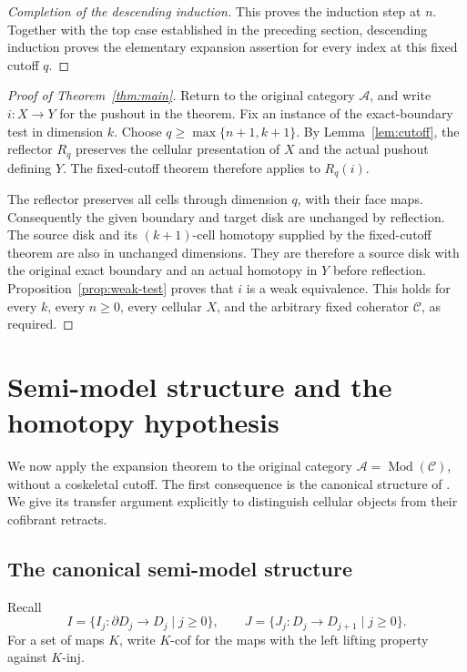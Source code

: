 \documentclass[11pt,letterpaper]{article}
\numberwithin{equation}{section}
\theoremstyle{plain}
\theoremstyle{definition}
\theoremstyle{remark}
\DeclareMathOperator{\Mod}{Mod}
\begin{document}
\begin{proof}[Completion of the descending induction]
This proves the induction step at \(n\).  Together with the top
case established in the preceding section, descending induction proves
the elementary expansion assertion for every index at this fixed
cutoff \(q\).
\end{proof}

\begin{proof}[Proof of Theorem~\ref{thm:main}]
Return to the original category \(\mathcal A\), and write
\(i:X\to Y\) for the pushout in the theorem.  Fix an instance of
the exact-boundary test in dimension \(k\).  Choose
\(q\ge\max\{n+1,k+1\}\).  By Lemma~\ref{lem:cutoff}, the
reflector \(R_q\) preserves the cellular presentation of \(X\)
and the actual pushout defining \(Y\).  The fixed-cutoff theorem
therefore applies to \(R_q(i)\).

The reflector preserves all cells through dimension \(q\), with
their face maps.  Consequently the given boundary and target disk are
unchanged by reflection.  The source disk and its \((k+1)\)-cell
homotopy supplied by the fixed-cutoff theorem are also in unchanged
dimensions.  They are therefore a source disk with the original exact
boundary and an actual homotopy in \(Y\) before reflection.
Proposition~\ref{prop:weak-test} proves that \(i\) is a weak
equivalence.  This holds for every \(k\), every \(n\ge0\),
every cellular \(X\), and the arbitrary fixed coherator
\(\mathcal C\), as required.
\end{proof}

\section{Semi-model structure and the homotopy hypothesis}
\label{sec:consequences}

We now apply the expansion theorem to the original category
\(\mathcal A=\Mod(\mathcal C)\), without a coskeletal cutoff.
The first consequence is the canonical structure of
\cite[Theorem~5.3.5]{Henry2016}.  We give its transfer argument explicitly
to distinguish cellular objects from their cofibrant retracts.

\subsection{The canonical semi-model structure}

Recall
\[
 I=\{I_j:\partial D_j\longrightarrow D_j\mid j\ge0\},
 \qquad
 J=\{J_j:D_j\longrightarrow D_{j+1}\mid j\ge0\}.
\]
For a set of maps \(K\), write \(K\text{-}\mathrm{cof}\)
for the maps with the left lifting property
against \(K\text{-}\mathrm{inj}\).
\end{document}
